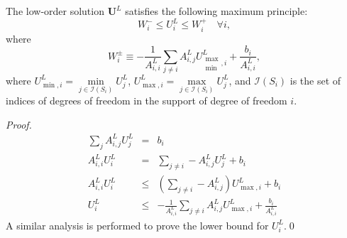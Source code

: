 \begin{theorem}
The low-order solution $\mathbf{U}^L$ satisfies the following maximum principle:
\begin{equation}\label{ss_max_principle}
   W_i^-\leq U_i^L\leq W_i^+\quad\forall i,
\end{equation}
where
\begin{equation}
   W_i^\pm \equiv -\frac{1}{A^L_{i,i}}\sum\limits_{j\ne i} A^L_{i,j}
      U_{\substack{\max\\\min},i}^L + \frac{b_i}{A^L_{i,i}},
\end{equation}
where $U_{\min,i}^L = \min\limits_{j\in \mathcal{I}(S_i)}U_j^L$, $U_{\max,i}^L
= \max\limits_{j\in \mathcal{I}(S_i)}U_j^L$,
and $\mathcal{I}(S_i)$ is the set of indices of degrees of freedom in the support
of degree of freedom $i$.
\end{theorem}
\begin{proof}
\begin{eqnarray*}
	\sum\limits_j A^L_{i,j}U_j^L & = & b_i\\
	A^L_{i,i}U_i^L & = & \sum\limits_{j\ne i} -A^L_{i,j}U_j^L + b_i\\
	A^L_{i,i}U_i^L & \le & \left(\sum\limits_{j\ne i} -A^L_{i,j}\right)U_{\max,i}^L + b_i\\
   U_i^L & \le & -\frac{1}{A^L_{i,i}}\sum\limits_{j\ne i} A^L_{i,j}U_{\max,i}^L
      + \frac{b_i}{A^L_{i,i}}
\end{eqnarray*}
A similar analysis is performed to prove the lower bound for $U_i^L$.\qed
\end{proof}